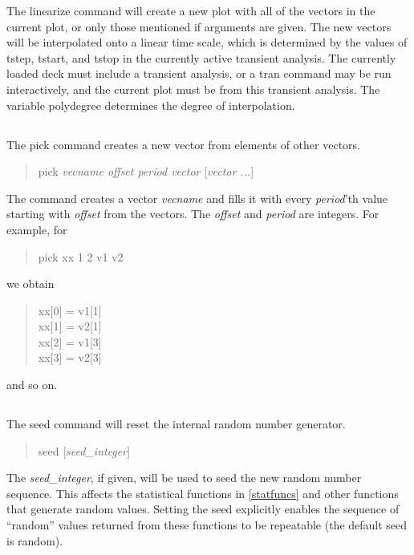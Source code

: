 The {\cb linearize} command will create a new plot with all of the
vectors in the current plot, or only those mentioned if arguments are
given.  The new vectors will be interpolated onto a linear time scale,
which is determined by the values of {\vt tstep}, {\vt tstart}, and
{\vt tstop} in the currently active transient analysis.  The currently
loaded deck must include a transient analysis, or a {\cb tran} command
may be run interactively, and the current plot must be from this
transient analysis.  The variable {\et polydegree} determines the
degree of interpolation.

\subsection{}


The {\cb pick} command creates a new vector from elements of other vectors.
\begin{quote}\vt
pick {\it vecname offset period vector} [{\it vector ...\/}]
\end{quote}
The command creates a vector {\it vecname} and fills it with every
{\it period\/}'th value starting with {\it offset} from the vectors. 
The {\it offset} and {\it period} are integers.  For example, for
\begin{quote}\vt
    pick xx 1 2 v1 v2
\end{quote}
we obtain
\begin{quote}\vt
  xx[0] = v1[1]\\
  xx[1] = v2[1]\\
  xx[2] = v1[3]\\
  xx[3] = v2[3]\\
\end{quote}
and so on.

\subsection{}


The {\cb seed} command will reset the internal random number generator.
\begin{quote}\vt
seed [{\it seed\_integer\/}]
\end{quote}
The {\it seed\_integer\/}, if given, will be used to seed the new
random number sequence.  This affects the statistical functions in
\ref{statfuncs} and other functions that generate random values. 
Setting the seed explicitly enables the sequence of ``random'' values
returned from these functions to be repeatable (the default seed is
random).


